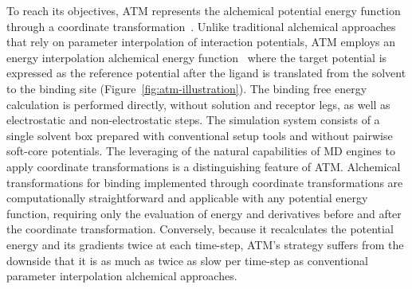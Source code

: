 \documentclass[9pt,bestpractices]{livecoms}
\begin{document}
To reach its objectives, ATM represents the alchemical potential energy function through a coordinate transformation~\cite{azimi2022application,azimi2022relative}. Unlike traditional alchemical approaches that rely on parameter interpolation of interaction potentials, ATM employs an energy interpolation alchemical energy function~\cite{konig2021efficient} where the target potential is expressed as the reference potential after the ligand is translated from the solvent to the binding site (Figure~\ref{fig:atm-illustration}). The binding free energy calculation is performed directly, without solution and receptor legs, as well as electrostatic and non-electrostatic steps. The simulation system consists of a single solvent box prepared with conventional setup tools and without pairwise soft-core potentials.  The leveraging of the natural capabilities of MD engines to apply coordinate transformations is a distinguishing feature of ATM. Alchemical transformations for binding implemented through coordinate transformations are computationally straightforward and applicable with any potential energy function, requiring only the evaluation of energy and derivatives before and after the coordinate transformation. Conversely, because it recalculates the potential energy and its gradients twice at each time-step, ATM's strategy suffers from the downside that it is as much as twice as slow per time-step as conventional parameter interpolation alchemical approaches.

\end{document}
